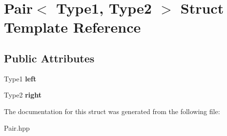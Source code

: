 \hypertarget{structPair}{}\section{Pair$<$ Type1, Type2 $>$ Struct Template Reference}
\label{structPair}
\subsection*{Public Attributes}
\begin{DoxyCompactItemize}
\item 
\mbox{\label{structPair_ab86bfd58f33f33e03e21d7155efac004}} 
Type1 {\bfseries left}
\item 
\mbox{\label{structPair_aaf0031924cde3a4eeefeecea7c7caaf0}} 
Type2 {\bfseries right}
\end{DoxyCompactItemize}


The documentation for this struct was generated from the following file\+:\begin{DoxyCompactItemize}
\item 
Pair.\+hpp\end{DoxyCompactItemize}
